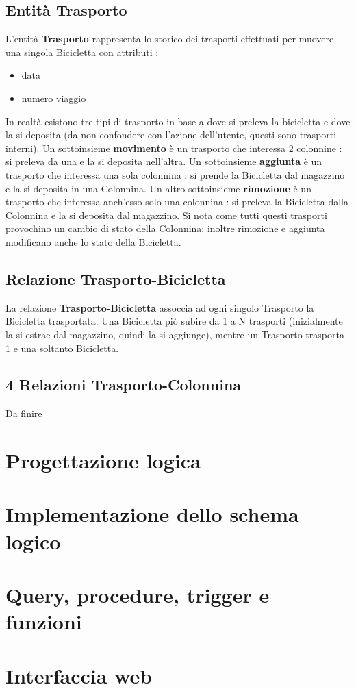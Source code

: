 \documentclass[a4paper,twoside]{article}
\begin{document}
\subsection{Entità Trasporto}
L'entità \textbf{Trasporto} rappresenta lo storico dei trasporti effettuati per muovere una singola Bicicletta con attributi :
\begin{itemize}
 \item data
 \item numero viaggio
\end{itemize}
In realtà esistono tre tipi di trasporto in base a dove si preleva la bicicletta e dove la si deposita (da non confondere con l'azione dell'utente, questi sono trasporti interni).\newline
Un sottoinsieme \textbf{movimento} è un trasporto che interessa 2 colonnine : si preleva da una e la si deposita nell'altra.\newline
Un sottoinsieme \textbf{aggiunta} è un trasporto che interessa una sola colonnina : si prende la Bicicletta dal magazzino e la si deposita in una Colonnina.\newline
Un altro sottoinsieme \textbf{rimozione} è un trasporto che interessa anch'esso solo una colonnina : si preleva la Bicicletta dalla Colonnina e la si deposita dal magazzino.\newline
Si nota come tutti questi trasporti provochino un cambio di stato della Colonnina; inoltre rimozione e aggiunta modificano anche lo stato della Bicicletta.

\subsection{Relazione Trasporto-Bicicletta}
La relazione \textbf{Trasporto-Bicicletta} assoccia ad ogni singolo Trasporto la Bicicletta trasportata.\newline
Una Bicicletta piò subire da 1 a N trasporti (inizialmente la si estrae dal magazzino, quindi la si aggiunge), mentre un Trasporto trasporta 1 e una soltanto Bicicletta.

\subsection{4 Relazioni Trasporto-Colonnina}
Da finire

\section{Progettazione logica}

\section{Implementazione dello schema logico}

\section{Query, procedure, trigger e funzioni}

\section{Interfaccia web}
\end{document}
